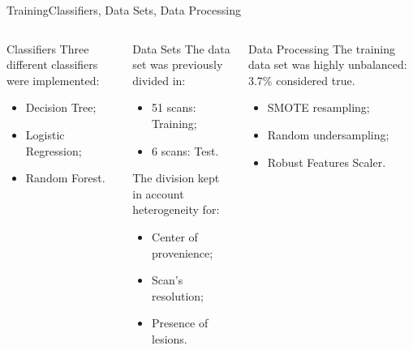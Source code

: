 \documentclass[]{standalone}
\begin{document}
	\begin{frame}{Training}{Classifiers, Data Sets, Data Processing}
	\vspace{-25pt}
	\begin{columns}
		\begin{column}{0.33\textwidth}
		\begin{block}{Classifiers}
		Three different classifiers were implemented:
		\begin{itemize}
			\item Decision Tree;
			\item Logistic Regression;
			\item Random Forest.
		\end{itemize}
		\end{block}
		\end{column}
		
		\begin{column}{0.33\textwidth}
		\begin{exampleblock}{Data Sets}
		The data set was previously divided in:
		\begin{itemize}
			\item 51 scans: Training;
			\item 6 scans: Test.
		\end{itemize}
		The division kept in account heterogeneity for:
		\begin{itemize}
			\item Center of provenience;
			\item Scan's resolution;
			\item Presence of lesions.
		\end{itemize}
		\end{exampleblock}
		\end{column}
		
		\begin{column}{0.33\textwidth}
		\begin{alertblock}{Data Processing}
		The training data set was highly unbalanced: $3.7\%$ considered true.
		\begin{itemize}
			\item SMOTE resampling;
			\item Random undersampling;
			\item Robust Features Scaler.
		\end{itemize}
		\end{alertblock}
		\end{column}
		
		
	\end{columns}
	\end{frame}
\end{document}
